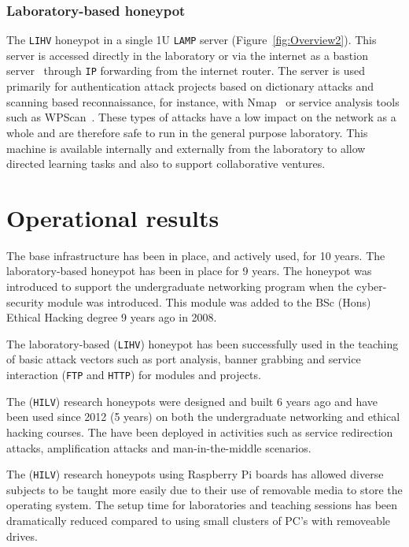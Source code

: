 \subsubsection{Laboratory-based honeypot}
The \texttt{LIHV} honeypot in a single 1U \texttt{LAMP} server (Figure~\ref{fig:Overview2}). This server is accessed directly in the laboratory or via the internet as a bastion server~\cite{MB:05} through \texttt{IP} forwarding from the internet router. The server is used primarily for authentication attack projects based on dictionary attacks and scanning based reconnaissance, for instance, with Nmap~\cite{GFL:09} or service analysis tools such as WPScan~\cite{WT:17}. These types of attacks have a low impact on the network as a whole and are therefore safe to run in the general purpose laboratory. This machine is available internally and externally from the laboratory to allow directed learning tasks and also to support collaborative ventures.

\section{Operational results}\label{Results}

The base infrastructure has been in place, and actively used, for 10 years. The laboratory-based honeypot has been in place for 9 years. The honeypot was introduced to support the undergraduate networking program when the cyber-security module was introduced. This module was added to the BSc (Hons) Ethical Hacking degree 9 years ago in 2008.

The laboratory-based (\texttt{LIHV}) honeypot has been successfully used in the teaching of basic attack vectors such as port analysis, banner grabbing and service interaction (\texttt{FTP} and \texttt{HTTP}) for modules and projects. 

The (\texttt{HILV}) research honeypots were designed and built 6 years ago and have been used since 2012 (5 years) on both the undergraduate networking and ethical hacking courses. The have been deployed in activities such as service redirection attacks, amplification attacks and man-in-the-middle scenarios.

The (\texttt{HILV}) research honeypots using Raspberry Pi boards has allowed diverse subjects to be taught more easily due to their use of removable media to store the operating system. The setup time for laboratories and teaching sessions has been dramatically reduced compared to using small clusters of PC's with removeable drives. 

